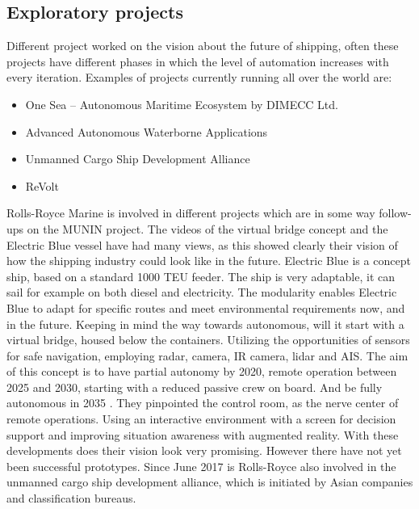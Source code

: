 \subsection{Exploratory projects}
Different project worked on the vision about the future of shipping, often these projects have different phases in which the level of automation increases with every iteration. Examples of projects currently running all over the world are:
\begin{itemize}
	\item One Sea – Autonomous Maritime Ecosystem by DIMECC Ltd.
	\item Advanced Autonomous Waterborne Applications
	\item Unmanned Cargo Ship Development Alliance 
	\item ReVolt
\end{itemize}

Rolls-Royce Marine is involved in different projects which are in some way follow-ups on the MUNIN project. The videos of the virtual bridge concept and the Electric Blue vessel have had many views, as this showed clearly their vision of how the shipping industry could look like in the future. Electric Blue is a concept ship, based on a standard 1000 \ac{TEU} feeder. The ship is very adaptable, it can sail for example on both diesel and electricity. The modularity enables Electric Blue to adapt for specific routes and meet environmental requirements now, and in the future. 
Keeping in mind the way towards autonomous, will it start with a virtual bridge, housed below the containers. Utilizing the opportunities of sensors for safe navigation, employing radar, camera, IR camera, lidar and \ac{AIS}. The aim of this concept is to have partial autonomy by 2020, remote operation between 2025 and 2030, starting with a reduced passive crew on board. And be fully autonomous in 2035 \cite{Wilson2017}. 
They pinpointed the control room, as the nerve center of remote operations. Using an interactive environment with a screen for decision support and improving situation awareness with augmented reality. With these developments does their vision look very promising. However there have not yet been successful prototypes.
Since June 2017 is Rolls-Royce also involved in the unmanned cargo ship development alliance, which is initiated by Asian companies and classification bureaus.

